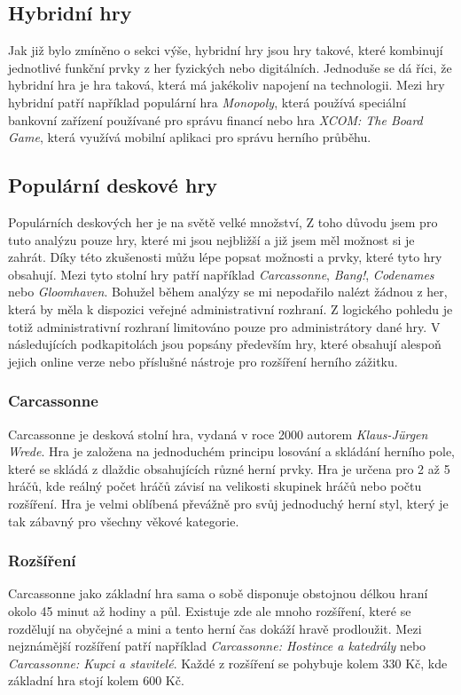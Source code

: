 \subsection*{Hybridní hry}
\label{subsec:popular-board-games-analysis-hybrid-games}
Jak již bylo zmíněno o sekci výše, hybridní hry jsou hry takové, které kombinují jednotlivé funkční prvky z her fyzických nebo digitálních. Jednoduše se dá říci, že hybridní hra je hra taková, která má jakékoliv napojení na technologii. Mezi hry hybridní patří například populární hra \textit{Monopoly}, která používá speciální bankovní zařízení používané pro správu financí nebo hra \textit{XCOM: The Board Game}, která využívá mobilní aplikaci pro správu herního průběhu.

\subsection{Populární deskové hry}
\label{subsec:popular-board-games-analysis-popular-games}
Populárních deskových her je na světě velké množství, Z toho důvodu jsem pro tuto analýzu pouze hry, které mi jsou nejbližší a již jsem měl možnost si je zahrát. Díky této zkušenosti můžu lépe popsat možnosti a prvky, které tyto hry obsahují. Mezi tyto stolní hry patří například \textit{Carcassonne}, \textit{Bang!}, \textit{Codenames} nebo \textit{Gloomhaven}. Bohužel během analýzy se mi nepodařilo nalézt žádnou z her, která by měla k dispozici veřejné administrativní rozhraní. Z logického pohledu je totiž administrativní rozhraní limitováno pouze pro administrátory dané hry. V následujících podkapitolách jsou popsány především hry, které obsahují alespoň jejich online verze nebo příslušné nástroje pro rozšíření herního zážitku.

\subsubsection{Carcassonne}
\label{subsubsec:popular-board-games-analysis-carcassonne}
Carcassonne je desková stolní hra, vydaná v roce 2000 autorem \textit{Klaus-Jürgen Wrede}. Hra je založena na jednoduchém principu losování a skládání herního pole, které se skládá z dlaždic obsahujících různé herní prvky. Hra je určena pro 2 až 5 hráčů, kde reálný počet hráčů závisí na velikosti skupinek hráčů nebo počtu rozšíření. Hra je velmi oblíbená převážně pro svůj jednoduchý herní styl, který je tak zábavný pro všechny věkové kategorie.

\subsubsection*{Rozšíření}
\label{subsubsec:popular-board-games-analysis-carcassonne-expansions}
Carcassonne jako základní hra sama o sobě disponuje obstojnou délkou hraní okolo 45 minut až hodiny a půl. Existuje zde ale mnoho rozšíření, které se rozdělují na obyčejné a mini a tento herní čas dokáží hravě prodloužit. Mezi nejznámější rozšíření patří například \textit{Carcassonne: Hostince a katedrály} nebo \textit{Carcassonne: Kupci a stavitelé}. Každé z rozšíření se pohybuje kolem 330 Kč, kde základní hra stojí kolem 600 Kč.

